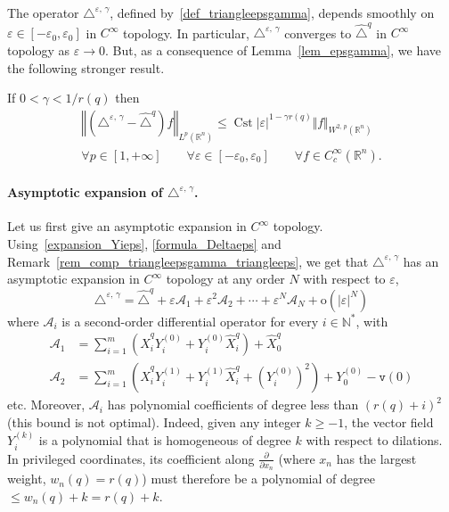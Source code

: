 \documentclass[AHL,Unicode,published]{cedram}
\newcommand*\R{\mathbb{R}}
\newcommand*\N{\mathbb{N}}
\newcommand{\calA}{\mathcal{A}}
\newcommand{\ttv}{\mathtt{v}}
\newcommand{\rmo}{\mathrm{o}}
\DeclareMathOperator{\Cst}{Cst}
\renewcommand{\geq}{\geqslant}
\renewcommand{\leq}{\leqslant}
\let\oldforall\forall
\renewcommand*{\forall}{\mathrel{\oldforall}}
\begin{document}
The operator $\triangle^{\varepsilon,\,\gamma}$, defined by~\eqref{def_triangleepsgamma}, depends smoothly on $\varepsilon\in[-\varepsilon_0,\varepsilon_0]$ in $C^\infty$ topology. In particular, $\triangle^{\varepsilon,\,\gamma}$ converges to $\widehat{\triangle}^{q}$ in $C^\infty$ topology as $\varepsilon\rightarrow 0$. But, as a consequence of Lemma~\ref{lem_epsgamma}, we have the following stronger result.

\begin{lemm}\label{lem_comp_triangleepsgamma_triangleeps2}
If $0<\gamma<1/r(q)$ then
\begin{multline*}
\left\Vert \left(\triangle^{\varepsilon,\,\gamma} - \widehat{\triangle}^{q}\right) f\right\Vert_{L^p(\R^n)} \leq \Cst \vert\varepsilon\vert^{1-\gamma r(q)}\Vert f\Vert_{W^{2,\,p}(\R^n)} \\
\forall p\in[1,+\infty] \qquad\forall\varepsilon\in[-\varepsilon_0,\varepsilon_0] \qquad \forall f\in C_c^\infty(\R^n).
\end{multline*}
\end{lemm}


\paragraph{Asymptotic expansion of $\triangle^{\varepsilon,\,\gamma}$.}
Let us first give an asymptotic expansion in $C^\infty$ topology. Using~\eqref{expansion_Yieps}, \eqref{formula_Deltaeps} and Remark~\ref{rem_comp_triangleepsgamma_triangleeps}, we get that $\triangle^{\varepsilon,\,\gamma}$ has an asymptotic expansion in $C^\infty$ topology at any order $N$ with respect to $\varepsilon$,
\begin{equation}\label{expansion_triangleepsilon1}
\triangle^{\varepsilon,\,\gamma} = \widehat{\triangle}^{q} + \varepsilon \calA_1 + \varepsilon^2 \calA_2 + \cdots + \varepsilon^N \calA_N + \rmo\left(\vert\varepsilon\vert^N\right)
\end{equation}
where $\calA_i$ is a second-order differential operator for every $i\in\N^*$, with
\begin{equation}\label{def_Ai}
\begin{split}
\calA_1 &= \sum_{i=1}^m \left(\widehat{X}^{q}_i Y^{(0)}_i + Y^{(0)}_i \widehat{X}^{q}_i \right) + \widehat{X}^{q}_0 \\
\calA_2 &= \sum_{i=1}^m \left(\widehat{X}^{q}_i Y^{(1)}_i + Y^{(1)}_i \widehat{X}^{q}_i + \left(Y^{(0)}_i \right)^2 \right) + Y^{(0)}_0 - \ttv(0)
\end{split}
\end{equation}
etc. Moreover, $\calA_i$ has polynomial coefficients of degree less than $(r(q)+i)^2$ (this bound is not optimal). Indeed, given any integer $k\geq -1$, the vector field $Y_i^{(k)}$ is a polynomial that is homogeneous of degree $k$ with respect to dilations. In privileged coordinates, its coefficient along $\frac{\partial}{\partial x_n}$ (where $x_n$ has the largest weight, $w_n(q)=r(q)$) must therefore be a polynomial of degree $\leq w_n(q)+k=r(q)+k$.
\end{document}
